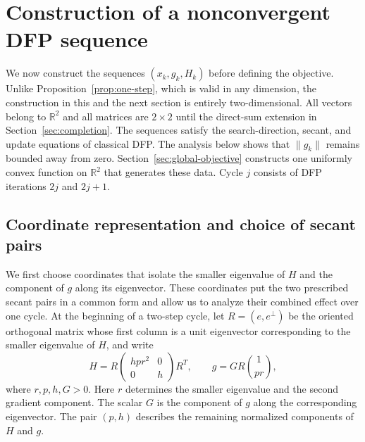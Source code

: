 \documentclass[11pt]{article}
\newcommand{\R}{\mathbb R}
\begin{document}
\section{Construction of a nonconvergent DFP sequence}
\label{sec:alternating-sequence}

We now construct the sequences $(x_k,g_k,H_k)$ before defining the objective.
Unlike Proposition~\ref{prop:one-step}, which is valid in any dimension, the
construction in this and the next section is entirely two-dimensional.  All
vectors belong to $\R^2$ and all matrices are $2\times2$ until the direct-sum
extension in Section~\ref{sec:completion}.  The sequences satisfy the
search-direction, secant, and update equations of classical DFP.  The analysis
below shows that $\|g_k\|$ remains bounded away from zero.
Section~\ref{sec:global-objective} constructs one uniformly convex function on
$\R^2$ that generates these data.  Cycle $j$ consists of DFP iterations
$2j$ and $2j+1$.

\subsection{Coordinate representation and choice of secant pairs}

We first choose coordinates that isolate the smaller eigenvalue of $H$ and
the component of $g$ along its eigenvector.  These coordinates put the two
prescribed secant pairs in a common form and allow us to analyze their
combined effect over one cycle.  At the beginning of a two-step cycle, let
$R=(e,e^\perp)$ be the oriented
orthogonal matrix whose first column is a unit eigenvector corresponding to
the smaller eigenvalue of $H$, and write
\begin{equation}\label{eq:coordinate-representation}
H=R\begin{pmatrix}hpr^2&0\\0&h\end{pmatrix}R^T,
\qquad
g=GR\binom{1}{pr},
\end{equation}
where $r,p,h,G>0$.  Here $r$ determines the smaller eigenvalue and the second
gradient component.  The scalar $G$ is the component of $g$ along the
corresponding eigenvector.  The pair $(p,h)$ describes the remaining normalized
components of $H$ and $g$.
\end{document}
